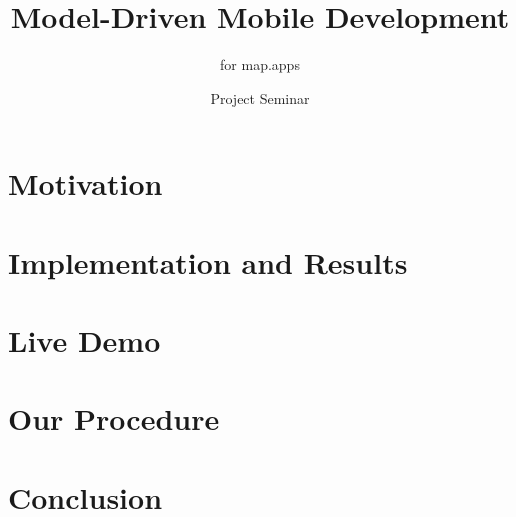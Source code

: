 \documentclass{beamer}
\author{Project Seminar \MD}
\title{Model-Driven Mobile Development}
\subtitle{\MD for map.apps}
\begin{document}
	\begin{frame}[plain]
	  \maketitle
	\end{frame}

    
    
    \section[Motivation]{Motivation}
    
    
    \section[Results]{Implementation and Results}
    
    
    \section{Live Demo}
    
    
    \section[Procedure]{Our Procedure}
    
    
    \section{Conclusion}
    
\end{document}
